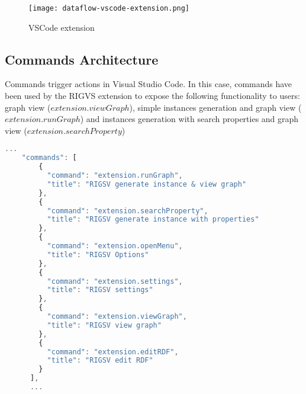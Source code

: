 \begin{figure}[htb]
	\centering
	\texttt{[image: dataflow-vscode-extension.png]}
	\caption{VSCode extension}
	\label{fig:vscode-extension}
  \end{figure}

\subsection{Commands Architecture}
Commands trigger actions in Visual Studio Code. In this case, commands have been used by the RIGVS extension to expose the following functionality to users: graph view ($extension.viewGraph$), simple instances generation and graph view ($extension.runGraph$) and instances generation with search properties and graph view ($extension.searchProperty$)

\begin{lstlisting}[caption={package.json commands declaration}, label={lst:commands-declaration}, language=JavaScript]
	...
	"commands": [
		{
		  "command": "extension.runGraph",
		  "title": "RIGSV generate instance & view graph"
		},
		{
		  "command": "extension.searchProperty",
		  "title": "RIGSV generate instance with properties"
		},
		{
		  "command": "extension.openMenu",
		  "title": "RIGSV Options"
		},
		{
		  "command": "extension.settings",
		  "title": "RIGSV settings"
		},
		{
		  "command": "extension.viewGraph",
		  "title": "RIGSV view graph"
		},
		{
		  "command": "extension.editRDF",
		  "title": "RIGSV edit RDF"
		}
	  ],
	  ...
	\end{lstlisting}

